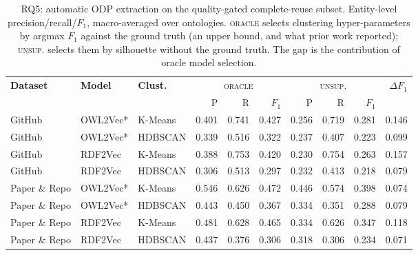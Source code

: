 \begin{table}[t]
\centering
\small
\caption{RQ5: automatic ODP extraction on the quality-gated complete-reuse subset. Entity-level precision/recall/$F_1$, macro-averaged over ontologies. \textsc{oracle} selects clustering hyper-parameters by argmax $F_1$ against the ground truth (an upper bound, and what prior work reported); \textsc{unsup.} selects them by silhouette without the ground truth. The gap is the contribution of oracle model selection.}
\label{tab:rq5_extraction}
\setlength{\tabcolsep}{4pt}
\begin{tabular}{ll|l|rrr|rrr|r}
\toprule
\textbf{Dataset} & \textbf{Model} & \textbf{Clust.} & \multicolumn{3}{c|}{\textsc{oracle}} & \multicolumn{3}{c|}{\textsc{unsup.}} & $\Delta F_1$ \\
 & & & P & R & $F_1$ & P & R & $F_1$ & \\
\midrule
GitHub & OWL2Vec* & K-Means & 0.401 & 0.741 & 0.427 & 0.256 & 0.719 & 0.281 & 0.146 \\
GitHub & OWL2Vec* & HDBSCAN & 0.339 & 0.516 & 0.322 & 0.237 & 0.407 & 0.223 & 0.099 \\
GitHub & RDF2Vec & K-Means & 0.388 & 0.753 & 0.420 & 0.230 & 0.754 & 0.263 & 0.157 \\
GitHub & RDF2Vec & HDBSCAN & 0.306 & 0.513 & 0.297 & 0.232 & 0.413 & 0.218 & 0.079 \\
Paper \& Repo & OWL2Vec* & K-Means & 0.546 & 0.626 & 0.472 & 0.446 & 0.574 & 0.398 & 0.074 \\
Paper \& Repo & OWL2Vec* & HDBSCAN & 0.443 & 0.450 & 0.367 & 0.334 & 0.351 & 0.288 & 0.079 \\
Paper \& Repo & RDF2Vec & K-Means & 0.481 & 0.628 & 0.465 & 0.334 & 0.626 & 0.347 & 0.118 \\
Paper \& Repo & RDF2Vec & HDBSCAN & 0.437 & 0.376 & 0.306 & 0.318 & 0.306 & 0.234 & 0.071 \\
\bottomrule
\end{tabular}
\end{table}

